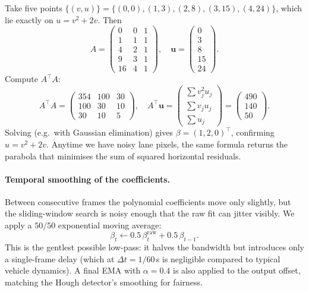 \begin{example}
Take five points $\{(v,u)\}=\{(0,0),(1,3),(2,8),(3,15),(4,24)\}$,
which lie exactly on $u=v^2+2v$. Then
\[
A=\begin{pmatrix}
0 & 0 & 1\\
1 & 1 & 1\\
4 & 2 & 1\\
9 & 3 & 1\\
16 & 4 & 1
\end{pmatrix},\quad
\mathbf u = \begin{pmatrix}0\\3\\8\\15\\24\end{pmatrix}.
\]
Compute $A^\top A$:
\[
A^\top A = \begin{pmatrix}354 & 100 & 30\\ 100 & 30 & 10\\ 30 & 10 & 5\end{pmatrix},\quad
A^\top \mathbf u = \begin{pmatrix}\sum v_j^2 u_j\\ \sum v_j u_j\\ \sum u_j\end{pmatrix}
                 = \begin{pmatrix}490\\140\\50\end{pmatrix}.
\]
Solving (e.g.\ with Gaussian elimination) gives $\beta=(1,2,0)^\top$,
confirming $u=v^2+2v$. Anytime we have noisy lane pixels, the same
formula returns the parabola that minimises the sum of squared
horizontal residuals.
\end{example}

\paragraph{Temporal smoothing of the coefficients.}
Between consecutive frames the polynomial coefficients move only
slightly, but the sliding-window search is noisy enough that the raw
fit can jitter visibly. We apply a $50/50$ exponential moving average:
\[
\beta_t \leftarrow 0.5\,\beta_t^{\text{raw}} + 0.5\,\beta_{t-1}.
\]
This is the gentlest possible low-pass: it halves the bandwidth but
introduces only a single-frame delay (which at $\Delta t=1/60$\,s is
negligible compared to typical vehicle dynamics). A final EMA with
$\alpha=0.4$ is also applied to the output offset, matching the Hough
detector's smoothing for fairness.

